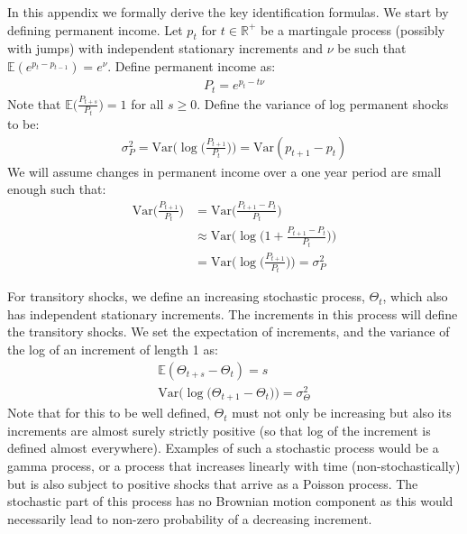 
In this appendix we formally derive the key identification formulas. We start by defining permanent income. Let $p_t$ for $t\in\mathbb{R}^+$ be a martingale process (possibly with jumps) with independent stationary increments and $\nu$ be such that $\mathbb{E}(e^{p_t - p_{t-1}})=e^{\nu}$. Define permanent income as:
\begin{align*}
P_t = e^{p_t - t \nu}
\end{align*}
Note that $\mathbb{E}\Big(\frac{P_{t+s}}{P_t}\Big)=1$ for all $s\geq 0$. Define the variance of log permanent shocks to be:
\begin{align*} \sigma^2_P=\mathrm{Var}\Big(\log\big(\frac{P_{t+1}}{P_t}\big)\Big) = \mathrm{Var}(p_{t+1}-p_t)
\end{align*}
We will assume changes in permanent income over a one year period are small enough such that:
\begin{align} \mathrm{Var}\Big(\frac{P_{t+1}}{P_t}\Big) &= \mathrm{Var}\Big(\frac{P_{t+1}-P_t}{P_t}\Big) \nonumber \\
& \approx \mathrm{Var}\Big(\log\big(1+\frac{P_{t+1}-P_t}{P_t}\big)\Big) \nonumber \\
&= \mathrm{Var}\Big(\log\big(\frac{P_{t+1}}{P_t}\big)\Big) = \sigma^2_P \label{permvar_approx}
\end{align}

For transitory shocks, we define an increasing stochastic process, $\Theta_t$, which also has independent stationary increments. The increments in this process will define the transitory shocks. We set the expectation of increments, and the variance of the log of an increment of length 1 as:
\begin{align*}
\mathbb{E}(\Theta_{t+s}-\Theta_t) = s \\
\mathrm{Var}\Big( \log\big(\Theta_{t+1}-\Theta_t\big)  \Big) = \sigma^2_{\Theta}
\end{align*}
Note that for this to be well defined, $\Theta_t$ must not only be increasing but also its increments are almost surely strictly positive (so that log of the increment is defined almost everywhere). Examples of such a stochastic process would be a gamma process, or a process that increases linearly with time (non-stochastically) but is also subject to positive shocks that arrive as a Poisson process. The stochastic part of this process has no Brownian motion component as this would necessarily lead to non-zero probability of a decreasing increment.

